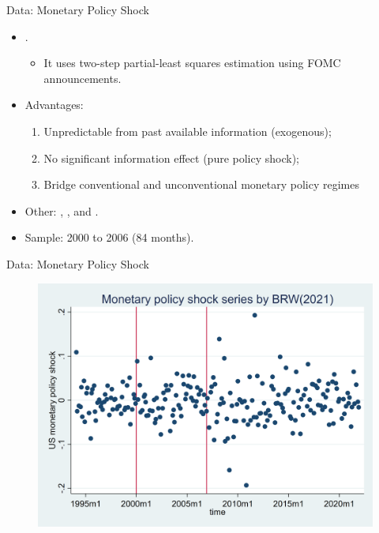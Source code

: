 \documentclass[10pt]{beamer}
\begin{document}
\begin{frame}{Data: Monetary Policy Shock}
    \begin{itemize}
        \item \cite{bu2021unified}.
        \begin{itemize}
            \item It uses \cite{fama1973risk} two-step partial-least squares estimation using FOMC announcements.
        \end{itemize}
        \item Advantages:
        \begin{enumerate}
            \item Unpredictable from past available information (exogenous);
            \item No significant information effect (pure policy shock);
            \item Bridge conventional and unconventional monetary policy regimes
        \end{enumerate}
        \item Other: \cite{nakamura2018high}, \cite{guraynak2005actions}, and \cite{jarocinski2020deconstructing}.
        \item Sample: 2000 to 2006 (84 months).
    \end{itemize}
\end{frame}

\begin{frame}{Data: Monetary Policy Shock}
    \begin{figure}[htbp]
	\centering
	\includegraphics[width=0.9\columnwidth]{latex/drafts/pic/BRW.png}
	\label{sum.brw}
    \end{figure}
\end{frame}
\end{document}
